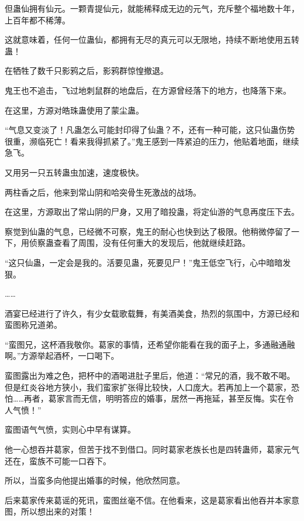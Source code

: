 \begin{this_body}
但蛊仙拥有仙元。一颗青提仙元，就能稀释成无边的元气，充斥整个福地数十年，上百年都不稀薄。

这就意味着，任何一位蛊仙，都拥有无尽的真元可以无限地，持续不断地使用五转蛊！

在牺牲了数千只影鸦之后，影鸦群惊惶撤退。

鬼王也不追击，飞过地刺鼠群的地盘后，在方源曾经落下的地方，也降落下来。

在这里，方源对皓珠蛊使用了蒙尘蛊。

“气息又变淡了！凡蛊怎么可能封印得了仙蛊？不，还有一种可能，这只仙蛊伤势很重，濒临死亡！看来我得抓紧了。”鬼王感到一阵紧迫的压力，他贴着地面，继续急飞。

又用另一只五转蛊虫加速，速度极快。

两柱香之后，他来到常山阴和哈突骨生死激战的战场。

在这里，方源取出了常山阴的尸身，又用了暗投蛊，将定仙游的气息再度压下去。

察觉到仙蛊的气息，已经微不可察，鬼王的耐心也快到达了极限。他稍微停留了一下，用侦察蛊查看了周围，没有任何重大的发现后，他就继续赶路。

“这只仙蛊，一定会是我的。活要见蛊，死要见尸！”鬼王低空飞行，心中暗暗发狠。

……

酒宴已经进行了许久，有少女载歌载舞，有美酒美食，热烈的氛围中，方源已经和蛮图称兄道弟。

“蛮图兄，这杯酒我敬你。葛家的事情，还希望你能看在我的面子上，多通融通融啊。”方源举起酒杯，一口喝下。

蛮图露出为难之色，把杯中的酒喝进肚子里后，他道：“常兄的酒，我不敢不喝。但是红炎谷地方狭小，我们蛮家扩张得比较快，人口庞大。若再加上一个葛家，恐怕……再者，葛家言而无信，明明答应的婚事，居然一再拖延，甚至反悔。实在令人气愤！”

蛮图语气气愤，实则心中早有谋算。

他一心想吞并葛家，但苦于找不到借口。同时葛家老族长也是四转蛊师，葛家元气还在，蛮族不可能一口吞下。

所以，当蛮多向他提出婚事的时候，他欣然同意。

后来葛家传来葛谣的死讯，蛮图丝毫不信。在他看来，这是葛家看出他吞并本家意图，所以想出来的对策！

\end{this_body}

